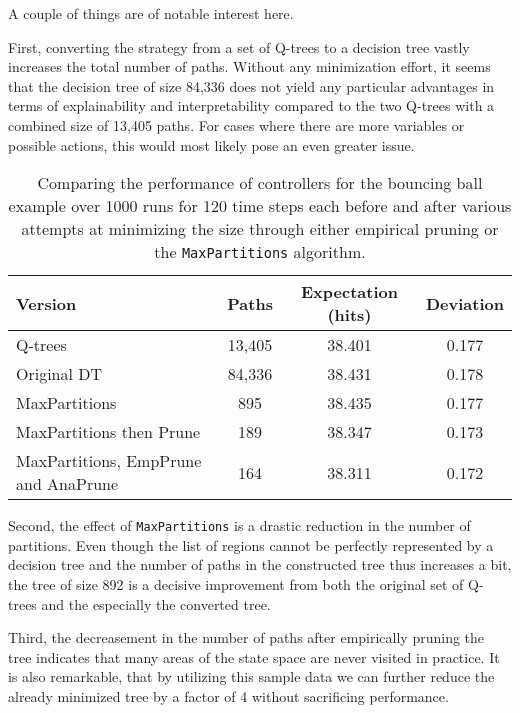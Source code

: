 A couple of things are of notable interest here.

First, converting the strategy from a set of Q-trees to a decision tree vastly
increases the total number of paths. Without any minimization effort, it seems
that the decision tree of size 84,336 does not yield any particular advantages
in terms of explainability and interpretability compared to the two Q-trees with
a combined size of 13,405 paths. For cases where there are more variables or
possible actions, this would most likely pose an even greater issue.

\begin{table}[ht]
    \centering
    \caption{%
        Comparing the performance of controllers for the bouncing ball example
        over 1000 runs for 120 time steps each before and after various attempts
        at minimizing the size through either empirical pruning or the
        \texttt{MaxPartitions} algorithm.
    }\label{tab:minimizedResults}
    \begin{tabular}[t]{lccc}
        \toprule
        Version & Paths & Expectation (hits) & Deviation \\
        \midrule
        Q-trees & 13,405 & 38.401 & 0.177 \\
        Original DT & 84,336 & 38.431 & 0.178 \\
        MaxPartitions & 895 & 38.435 & 0.177 \\
        MaxPartitions then Prune & 189 & 38.347 & 0.173 \\
        MaxPartitions, EmpPrune and AnaPrune & 164 & 38.311 & 0.172 \\
        \bottomrule
    \end{tabular}
\end{table}

Second, the effect of \texttt{MaxPartitions} is a drastic reduction in the
number of partitions. Even though the list of regions cannot be perfectly
represented by a decision tree and the number of paths in the constructed tree
thus increases a bit, the tree of size 892 is a decisive improvement from both
the original set of Q-trees and the especially the converted tree.

Third, the decreasement in the number of paths after empirically pruning the
tree indicates that many areas of the state space are never visited in practice.
It is also remarkable, that by utilizing this sample data we can further reduce
the already minimized tree by a factor of 4 without sacrificing performance.

